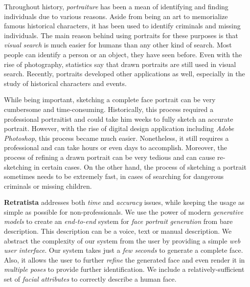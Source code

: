 Throughout history, \emph{portraiture} has been a mean of identifying and finding individuals due to various reasons. Aside from being an art to memorialize famous historical characters, it has been used to identify criminals and missing individuals. The main reason behind using portraits for these purposes is that \emph{visual search} is much easier for humans than any other kind of search. Most people can identify a person or an object, they have seen before. Even with the rise of photography, statistics say that drawn portraits are still used in visual search. Recently, portraits developed other applications as well, especially in the study of historical characters and events.

While being important, sketching a complete face portrait can be very cumbersome and time-consuming. Historically, this process required a professional portraitist and could take him weeks to fully sketch an accurate portrait. However, with the rise of digital design application including \emph{Adobe Photoshop}, this process became much easier. Nonetheless, it still requires a professional and can take hours or even days to accomplish. Moreover, the process of refining a drawn portrait can be very tedious and can cause re-sketching in certain cases. On the other hand, the process of sketching a portrait sometimes needs to be extremely fast, in cases of searching for dangerous criminals or missing children. 

\textbf{Retratista} addresses both \emph{time} and \emph{accuracy} issues, while keeping the usage as simple as possible for non-professionals. We use the power of modern \emph{generative models} to create an \emph{end-to-end} system for \emph{face portrait generation} from bare description. This description can be a voice, text or manual description. We abstract the complexity of our system from the user by providing a simple \emph{web user interface}. Our system takes just a \emph{few seconds} to generate a complete face. Also, it allows the user to further \emph{refine} the generated face and even render it in \emph{multiple poses} to provide further identification. We include a relatively-sufficient set of \emph{facial attributes} to correctly describe a human face.
